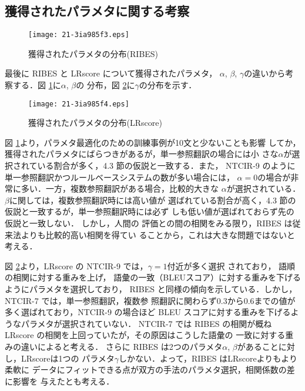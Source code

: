 \documentclass[japanese]{jnlp_1.4}
\begin{document}
\subsection{獲得されたパラメタに関する考察}

 \begin{figure}[b]
   \begin{center}
\texttt{[image: 21-3ia985f3.eps]}
   \end{center}
    \caption{獲得されたパラメタの分布(RIBES)}
    \label{parm}
\end{figure}

最後に RIBES と LRscore について獲得されたパラメタ，
$\alpha$, $\beta$, $\gamma$の違いから考察する．図 \ref{parm}に$\alpha$, $\beta$の
分布，図 \ref{lr-parm}に$\gamma$の分布を示す．

 \begin{figure}[t]
   \begin{center}
\texttt{[image: 21-3ia985f4.eps]}
   \end{center}
    \caption{獲得されたパラメタの分布(LRscore)}
    \label{lr-parm}
\end{figure}

図 \ref{parm}より，パラメタ最適化のための訓練事例が10文と少ないことも影響
してか，獲得されたパラメタにばらつきがあるが，単一参照翻訳の場合には小
さな$\alpha$が選択されている割合が多く，4.3 節の仮説と一致する．また，
NTCIR-9 のように単一参照翻訳かつルールベースシステムの数が多い場合には，
$\alpha=0$の場合が非常に多い．一方，複数参照翻訳がある場合，比較的大きな
$\alpha$が選択されている．$\beta$に関しては，複数参照翻訳時には高い値が
選ばれている割合が高く，4.3 節の仮説と一致するが，単一参照翻訳時には必ず
しも低い値が選ばれておらず先の仮説と一致しない．
しかし，人間の
評価との間の相関をみる限り，RIBES は従来法よりも比較的高い相関を得てい
ることから，これは大きな問題ではないと考える．

図 \ref{lr-parm}より，LRscore の NTCIR-9 では，$\gamma=1$付近が多く選択
されており，
語順の相関に対する重みを上げ，
語彙の一致（BLEUスコア）に対する重みを下げるようにパラメタを選択しており，
RIBES と同様の傾向を示している．しかし，NTCIR-7 では，単一参照翻訳，複数参
照翻訳に関わらず0.3から0.6までの値が多く選ばれており，NTCIR-9 の場合ほど
BLEU スコアに対する重みを下げるようなパラメタが選択されていない．
NTCIR-7
では RIBES の相関が概ね LRscore の相関を上回っていたが，その原因はこうした語彙の
一致に対する重みの違いによると考える．
さらに RIBES は2つのパラメタ$\alpha$, $\beta$があることに対し，LRscoreは1つの
パラメタ$\gamma$しかない．よって，RIBES はLRscoreよりもより柔軟に
データにフィットできる点が双方の手法のパラメタ選択，相関係数の差に影響を
与えたとも考える．
\end{document}
